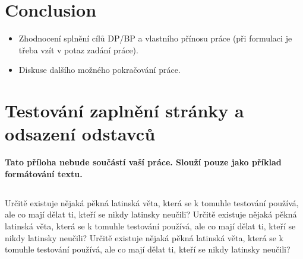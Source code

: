\documentclass[11pt,twoside,a4paper]{book}
\begin{document}
	
	\chapter{Conclusion}
	
	\begin{itemize}
		\item Zhodnocení splnění cílů DP/BP a  vlastního přínosu práce (při formulaci je třeba vzít v potaz zadání práce).
		\item Diskuse dalšího možného pokračování práce.
	\end{itemize} 
	
	
	
	{
		\def\CS{$\cal C\kern-0.1667em\lower.5ex\hbox{$\cal S$}\kern-0.075em $}
		
	}
	
	
	\appendix
	
	\chapter{Testování zaplnění stránky a odsazení odstavců}
	\textbf{\large Tato příloha nebude součástí vaší práce. 
		Slouží pouze jako příklad formátování textu.}
	
	\section*{}
	Určitě existuje nějaká pěkná latinská věta, která se k tomuhle testování používá, ale co mají dělat ti, kteří se nikdy latinsky neučili? Určitě existuje nějaká pěkná latinská věta, která se k tomuhle testování používá, ale co mají dělat ti, kteří se nikdy latinsky neučili? Určitě existuje nějaká pěkná latinská věta, která se k tomuhle testování používá, ale co mají dělat ti, kteří se nikdy latinsky neučili?
	
\end{document}
